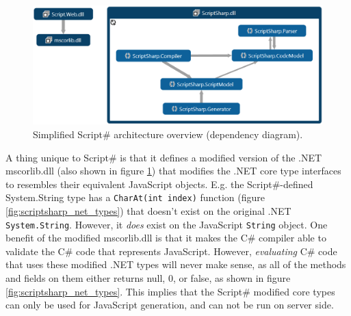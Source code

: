 		\begin{figure}[H]
			\begin{center}
				\centerline{\includegraphics[width=16cm]{resources/images/SimplifiedOverview.png}}
			\end{center}
			\caption{Simplified Script\# architecture overview (dependency diagram).}
			\label{simplifiedOverview}
		\end{figure}


		A thing unique to Script\# is that it defines a modified version of the .NET mscorlib.dll (also shown in figure \ref{simplifiedOverview}) that modifies the .NET core type interfaces to resembles their equivalent JavaScript objects. E.g. the Script\#-defined System.String type has a \texttt{CharAt(int index)} function (figure \ref{fig:scriptsharp_net_types}) that doesn't exist on the original .NET \texttt{System.String}. However, it \emph{does} exist on the JavaScript \texttt{String} object. One benefit of the modified mscorlib.dll is that it makes the C\# compiler able to validate the C\# code that represents JavaScript. However, \emph{evaluating} C\# code that uses these modified .NET types will never make sense, as all of the methods and fields on them either returns null, 0, or false, as shown in figure \ref{fig:scriptsharp_net_types}. This implies that the Script\# modified core types can only be used for JavaScript generation, and can not be run on server side.


